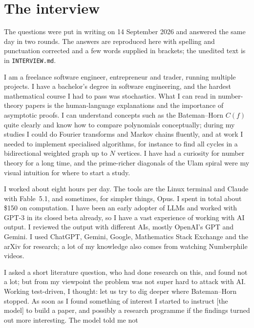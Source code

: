 \documentclass[11pt,a4paper]{article}
\newcommand{\file}[1]{\texttt{#1}}
\begin{document}
\appendix
\section{The interview}\label{app:interview}
The questions were put in writing on 14 September 2026 and answered the same day in two rounds. The answers are
reproduced here with spelling and punctuation corrected and a few words supplied in brackets; the unedited text is in
\file{INTERVIEW.md}.

\begin{description}[leftmargin=1.2em,itemsep=4pt,font=\normalfont\itshape]
\item[Q1, background.] I am a freelance software engineer, entrepreneur and trader, running multiple projects. I have
a bachelor's degree in software engineering, and the hardest mathematical course I had to pass was stochastics. What I
can read in number-theory papers is the human-language explanations and the importance of asymptotic proofs. I can
understand concepts such as the Bateman--Horn $C(f)$ quite clearly and know how to compare polynomials conceptually;
during my studies I could do Fourier transforms and Markov chains fluently, and at work I needed to implement
specialised algorithms, for instance to find all cycles in a bidirectional weighted graph up to $N$ vertices. I have
had a curiosity for number theory for a long time, and the prime-richer diagonals of the Ulam spiral were my visual
intuition for where to start a study.
\item[Q2, tools and cost.] I worked about eight hours per day. The tools are the Linux terminal and Claude with
Fable~5.1, and sometimes, for simpler things, Opus. I spent in total about \$150 on computation. I have been an early
adopter of LLMs and worked with GPT-3 in its closed beta already, so I have a vast experience of working with AI
output. I reviewed the output with different AIs, mostly OpenAI's GPT and Gemini. I used ChatGPT, Gemini, Google,
Mathematics Stack Exchange and the arXiv for research; a lot of my knowledge also comes from watching Numberphile
videos.
\item[Q3, the turn.] I asked a short literature question, who had done research on this, and found not a lot; but from
my viewpoint the problem was not super hard to attack with AI. Working test-driven, I thought: let us try to dig
deeper where Bateman--Horn stopped. As soon as I found something of interest I started to instruct [the model] to
build a paper, and possibly a research programme if the findings turned out more interesting. The model told me not

\end{description}
\end{document}
